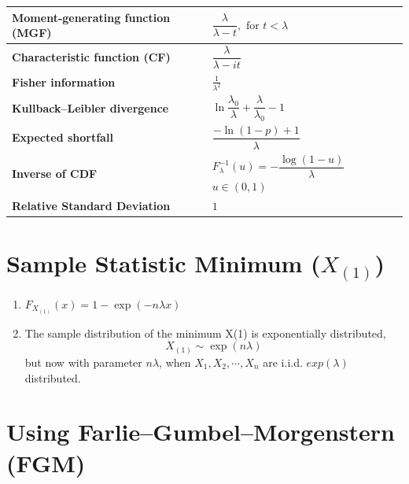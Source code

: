 \begin{longtable}{|m{6cm}|p{9cm}|}
    \textbf{Moment-generating function (MGF)} &
    ${\displaystyle {\dfrac {\lambda }{\lambda -t}},{\text{ for }}t<\lambda }$
    \\[1ex] \hline

    \textbf{Characteristic function (CF)} &
    ${\displaystyle {\dfrac {\lambda }{\lambda -it}}}$
    \\[1ex] \hline

    \textbf{Fisher information} &
    ${\displaystyle {\frac {1}{\lambda ^{2}}}}$
    \\[1ex] \hline

    \textbf{Kullback–Leibler divergence} &
    ${\displaystyle \ln {\dfrac {\lambda _{0}}{\lambda }}+{\dfrac {\lambda }{\lambda _{0}}}-1}$
    \\[1ex] \hline

    \textbf{Expected shortfall} &
    ${\displaystyle {\dfrac {-\ln(1-p)+1}{\lambda }}}$
    \\[1ex] \hline

    \textbf{Inverse of CDF \cite{ism-1}} &
    $F_\lambda^{-1}(u) = -\dfrac{\log(1-u)}{\lambda}$ $u \in (0,1)$
    \\[1ex] \hline

    \textbf{Relative Standard Deviation} &
    $1$
    \\[1ex] \hline

\end{longtable}
\renewcommand{\arraystretch}{1}


\section{Sample Statistic Minimum ($X_{(1)}$) \cite{ism-1}} \label{Exponential Distribution: Sample Statistic Minimum}

\begin{enumerate}
    \item $F_{X_{(1)}}(x) = 1 - \exp(-n\lambda x)$

    \item The sample distribution of the minimum X(1) is exponentially distributed, 
    \[
        X_{(1)} \sim \exp(n\lambda)
    \]
    but now with parameter $n\lambda$, when $X_1,X_2,\cdots, X_n$ are i.i.d. $exp(\lambda)$ distributed.
    
\end{enumerate}


\section{Using Farlie–Gumbel–Morgenstern (FGM) \cite{ism-1}} \label{Sample Statistic Minimum: Using Farlie–Gumbel–Morgenstern (FGM)}

